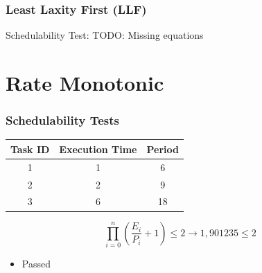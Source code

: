 \documentclass[xcolor=table]{beamer}
\begin{document}
\begin{frame}
\frametitle{Least Laxity First (\textbf{LLF})}

\begin{block}{Schedulability Test:}
TODO: Missing equations
\end{block}

\end{frame}
\section{Rate Monotonic}
\begin{frame}
\frametitle{Schedulability Tests}
\begin{table}[]
\begin{tabular}{|c|c|c|}
\hline
\textbf{Task ID} & \textbf{Execution Time} & \textbf{Period}\\ \hline
\cellcolor[HTML]{ECF6CE}1 &\cellcolor[HTML]{ECF6CE}1 &\cellcolor[HTML]{ECF6CE}6 \\ \hline
\cellcolor[HTML]{A4A4A4}2 &\cellcolor[HTML]{A4A4A4}2 &\cellcolor[HTML]{A4A4A4}9 \\ \hline
\cellcolor[HTML]{F781D8}3 &\cellcolor[HTML]{F781D8}6 &\cellcolor[HTML]{F781D8}18 \\ \hline
\end{tabular}
\end{table}
\begin{equation}
\prod_{i=0}^{n} \left( \frac{E_i}{P_i}+1 \right) \leq 2 \rightarrow1,901235 \leq 2
\end{equation}
\begin{itemize}
\item Passed\end{itemize}
\end{frame}
\end{document}

